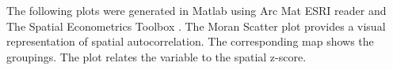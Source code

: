 


%

The following plots were generated in Matlab using Arc Mat ESRI
reader and The Spatial Econometrics Toolbox .  The
Moran Scatter plot provides a visual representation of spatial
autocorrelation. The corresponding map shows the groupings.  The
plot relates the variable to the spatial z-score.
\\\\

